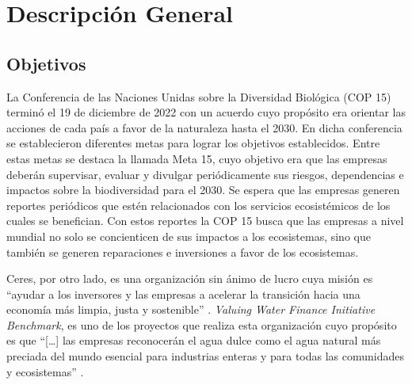 \section{Descripción General} \label{sec:descripcion-general}

\subsection{Objetivos} \label{subsec:objetivos}
La Conferencia de las Naciones Unidas sobre la Diversidad Biológica (COP 15) terminó el 19 de diciembre de 2022 con un acuerdo cuyo propósito era orientar las acciones de cada país a favor de la naturaleza hasta el 2030. En dicha conferencia se establecieron diferentes metas para lograr los objetivos establecidos. Entre estas metas se destaca la llamada Meta 15, cuyo objetivo era que las empresas deberán supervisar, evaluar y divulgar periódicamente sus riesgos, dependencias e impactos sobre la biodiversidad para el 2030. Se espera que las empresas generen reportes periódicos que estén relacionados con los servicios ecosistémicos de los cuales se benefician. Con estos reportes la COP 15 busca que las empresas a nivel mundial no solo se concienticen de sus impactos a los ecosistemas, sino que también se generen reparaciones e inversiones a favor de los ecosistemas.

\hfill

Ceres, por otro lado, es una organización sin ánimo de lucro cuya misión es “ayudar a los inversores y las empresas a acelerar la transición hacia una economía más limpia, justa y sostenible” \parencite{ceres-no-date}. \textit{Valuing Water Finance Initiative Benchmark}, es uno de los proyectos que realiza esta organización cuyo propósito es que “[…] las empresas reconocerán el agua dulce como el agua natural más preciada del mundo esencial para industrias enteras y para todas las comunidades y ecosistemas” \parencite{ceres-2023B}.

\hfill

